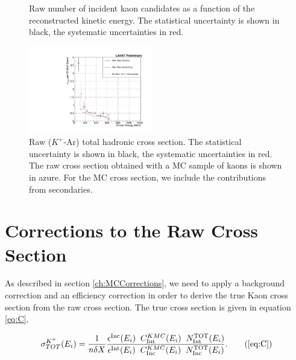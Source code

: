 \begin{figure}[]
\begin{minipage}[t]{0.45\textwidth}
\caption{Raw number of incident kaon candidates as a function of the reconstructed kinetic energy. The statistical uncertainty is shown in black, the systematic uncertainties in red.}
\label{fig:IncidentRawK}
\end{minipage}
\end{figure}



\begin{figure}
\centering  
\includegraphics[width=0.48\textwidth]{Chapter-7/Images/Plots_MCData_XS_StatSystK_WithDK.pdf}
\caption{Raw ($K^+$-Ar) total hadronic cross section. The statistical uncertainty is shown in black, the systematic uncertainties in red. The raw cross section obtained with a MC sample of kaons is shown in azure. For the MC cross section,  we include the contributions from secondaries. }
\label{fig:XSRawK}
\end{figure}


\section{Corrections to the Raw Cross Section}\label{ch:KaonXSCorrections}
As described in section \ref{ch:MCCorrections}, we need to apply a background correction and an efficiency correction in order to derive the true Kaon cross section from the raw cross section.  The true cross section is given in equation \ref{eq:C}, 

\begin{equation}
   \sigma^{K^+}_{TOT}(E_{i})  = \frac{1}{n \delta X}\frac{ \epsilon^{\text{Inc}}(E_i)  \hspace{0.2cm} C^{K MC}_{\text{Int}} (E_{i}) \hspace{0.2cm} N^{\text{TOT}}_{\text{Int}} (E_{i}) }{   \epsilon^{\text{Int}}(E_i) \hspace{0.2cm} C^{K MC}_{\text{Inc}} (E_{i}) \hspace{0.2cm}  N^{\text{TOT}}_{\text{Inc}} (E_{i})}.
 \tag{\ref{eq:C}}
\end{equation}

